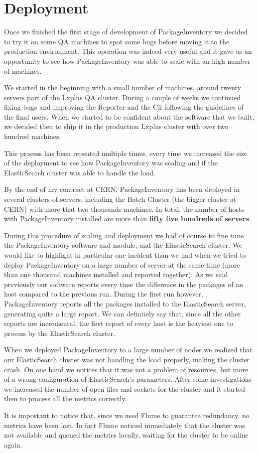 \section{Deployment}

Once we finished the first stage of development of PackageInventory we
decided to try it on some QA machines to spot some bugs before moving it
to the production environment. This operation was indeed very useful and
it gave us an opportunity to see how PackageInventory was able to scale
with an high number of machines.

We started in the beginning with a small number of machines, around twenty
servers part of the Lxplus QA cluster. During a couple of weeks we
continued fixing bugs and improving the Reporter and the Cli following the
guidelines of the final users. When we started to be confident about the
software that we built, we decided then to ship it in the production
Lxplus cluster with over two hundred machines.

This process has been repeated multiple times, every time we increased the
size of the deployment to see how PackageInventory was scaling and if the
ElasticSearch cluster was able to handle the load.

By the end of my contract at CERN, PackageInventory has been deployed in
several clusters of servers, including the Batch Cluster (the bigger
cluster at CERN) with more that two thousands machines. In total, the
number of hosts with PackageInventory installed are more than
\textbf{fifty five hundreds of servers}.

During this procedure of scaling and deployment we had of course to fine
tune the PackageInventory software and module, and the ElasticSearch
cluster. We would like to highlight in particular one incident than we had
when we tried to deploy PackageInventory on a large number of server at
the same time (more than one thousand machines installed and reported
together). As we said previously our software reports every time the
difference in the packages of an host compared to the previous run. During
the first run however, PackageInventory reports all the packages installed
to the ElasticSearch server, generating quite a large report. We can
definitely say that, since all the other reports are incremental, the
first report of every host is the heaviest one to process by the
ElasticSearch cluster.

When we deployed PackageInventory to a large number of nodes we realized
that our ElasticSearch cluster was not handling the load properly, making
the cluster crash. On one hand we notices that it was not a problem of
resources, but more of a wrong configuration of ElasticSearch's
parameters. After some investigations we increased the number of open
files and sockets for the cluster and it started then to process all the
metrics correctly.

It is important to notice that, since we used Flume to guarantee
redundancy, no metrics have been lost. In fact Flume noticed immediately
that the cluster was not available and queued the metrics locally, waiting
for the cluster to be online again.

